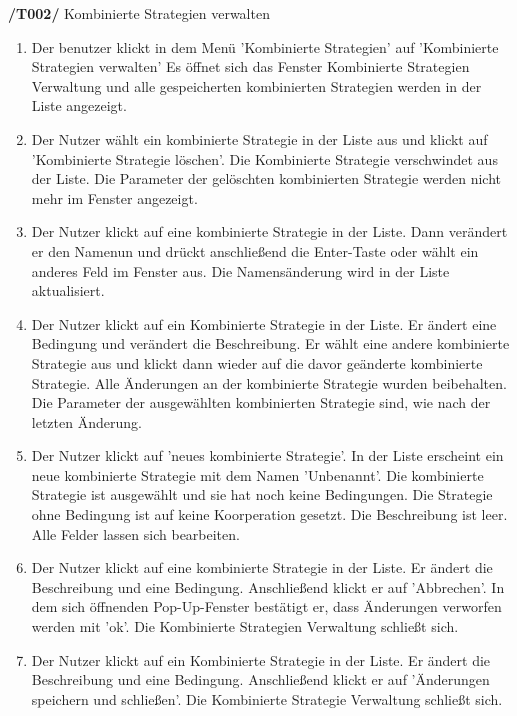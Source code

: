 \textbf{/T002/} Kombinierte Strategien verwalten
\begin{enumerate}
\item {}
{Der benutzer klickt in dem Menü 'Kombinierte Strategien' auf 'Kombinierte Strategien verwalten'}
{Es öffnet sich das Fenster Kombinierte Strategien Verwaltung und alle gespeicherten kombinierten Strategien werden in der Liste angezeigt.}

\item {}
{Der Nutzer wählt ein kombinierte Strategie in der Liste aus und klickt auf 'Kombinierte Strategie löschen'.}
{Die Kombinierte Strategie verschwindet aus der Liste. Die Parameter der gelöschten kombinierten Strategie werden nicht mehr im Fenster angezeigt.}

\item {}
{Der Nutzer klickt auf eine kombinierte Strategie in der Liste. Dann verändert er den Namenun und drückt anschließend die Enter-Taste oder wählt ein anderes Feld im Fenster aus.}
{Die Namensänderung wird in der Liste aktualisiert. }

\item {}
{Der Nutzer klickt auf ein Kombinierte Strategie in der Liste. Er ändert eine Bedingung und verändert die Beschreibung. Er wählt eine andere kombinierte Strategie aus und klickt dann wieder auf die davor geänderte kombinierte Strategie.}
{Alle Änderungen an der kombinierte Strategie wurden beibehalten. Die Parameter der ausgewählten kombinierten Strategie sind, wie nach der letzten Änderung.}

\item {}
{Der Nutzer klickt auf 'neues kombinierte Strategie'.}
{In der Liste erscheint ein neue kombinierte Strategie mit dem Namen 'Unbenannt'. Die kombinierte Strategie ist ausgewählt und sie hat noch keine Bedingungen. Die Strategie ohne Bedingung ist auf keine Koorperation gesetzt. Die Beschreibung ist leer. Alle Felder lassen sich bearbeiten.}

\item {}
{Der Nutzer klickt auf eine kombinierte Strategie in der Liste. Er ändert die Beschreibung und eine Bedingung. Anschließend klickt er auf 'Abbrechen'. In dem sich öffnenden Pop-Up-Fenster bestätigt er, dass Änderungen verworfen werden mit 'ok'.}
{Die Kombinierte Strategien Verwaltung schließt sich.}

\item {}
{Der Nutzer klickt auf ein Kombinierte Strategie in der Liste. Er ändert die Beschreibung und eine Bedingung. Anschließend klickt er auf 'Änderungen speichern und schließen'.}
{Die Kombinierte Strategie Verwaltung schließt sich.}


\end{enumerate}

